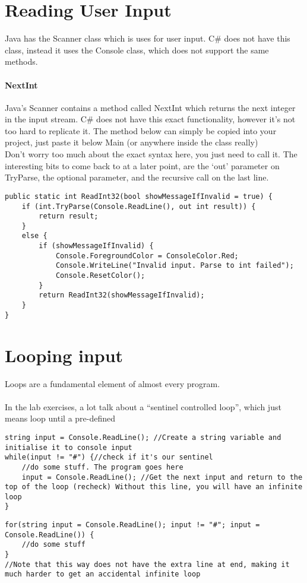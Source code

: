 \documentclass{article}
\begin{document}
\section{Reading User Input}
Java has the Scanner class which is uses for user input. C\# does not have this class, instead it uses the Console class, which does not support the same methods.

\paragraph{NextInt}
Java's Scanner contains a method called NextInt which returns the next integer in the input stream. C\# does not have this exact functionality, however it's not too hard to replicate it. The method below can simply be copied into your project, just paste it below Main (or anywhere inside the class really)\\
Don't worry too much about the exact syntax here, you just need to call it. The interesting bits to come back to at a later point, are the `out' parameter on TryParse, the optional parameter, and the recursive call on the last line.

\begin{lstlisting}
public static int ReadInt32(bool showMessageIfInvalid = true) {
	if (int.TryParse(Console.ReadLine(), out int result)) {
		return result;
	}
	else {
		if (showMessageIfInvalid) {
			Console.ForegroundColor = ConsoleColor.Red;
			Console.WriteLine("Invalid input. Parse to int failed");
			Console.ResetColor();
		}
		return ReadInt32(showMessageIfInvalid);
	}
}
\end{lstlisting}

\section{Looping input}
Loops are a fundamental element of almost every program.

\paragraph{}
 In the lab exercises, a lot talk about a ``sentinel controlled loop'', which just means loop until a pre-defined

\begin{lstlisting}[caption={The normal way}]
string input = Console.ReadLine(); //Create a string variable and initialise it to console input
while(input != "#") {//check if it's our sentinel
    //do some stuff. The program goes here
    input = Console.ReadLine(); //Get the next input and return to the top of the loop (recheck) Without this line, you will have an infinite loop
}
\end{lstlisting}

\begin{lstlisting}[caption={The fancy way}]
for(string input = Console.ReadLine(); input != "#"; input = Console.ReadLine()) {
    //do some stuff
}
//Note that this way does not have the extra line at end, making it much harder to get an accidental infinite loop
\end{lstlisting}
\end{document}
